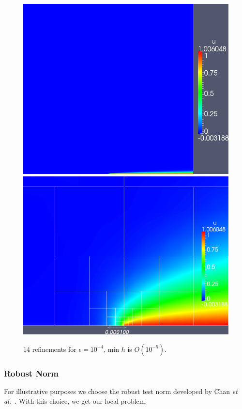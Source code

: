\documentclass[letterpaper]{article}
\def\etal{{\it et al.~}}
\begin{document}
\begin{figure}[!h]
\centering
\includegraphics[scale=.25]{figs/LaplaceFigs/coupled1e4h1e5.png}
\includegraphics[scale=.227]{figs/LaplaceFigs/coupled1e4h1e5Zoom.png}
\caption{14 refinements for $\epsilon = 10^{-4}$, min $h$ is $O(10^{-5})$.}
\label{fig:newNormSmallEps}
\end{figure}

\subsubsection{Robust Norm}
For illustrative purposes we choose the robust
test norm developed by Chan \etal\cite{ChanHeuerThanhDemkowicz2012}. With this
choice, we get our local problem:
\end{document}
